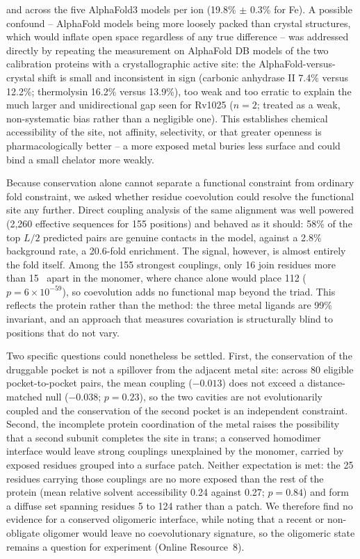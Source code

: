 \documentclass[11pt,a4paper]{article}
\newcommand{\ang}{\text{\AA}}
\begin{document}
and across the five AlphaFold3 models per ion (19.8\% $\pm$ 0.3\% for Fe). A possible confound -- AlphaFold models being more loosely packed than crystal structures, which would inflate open space regardless of any true difference -- was addressed directly by repeating the measurement on AlphaFold DB models of the two calibration proteins with a crystallographic active site: the AlphaFold-versus-crystal shift is small and inconsistent in sign (carbonic anhydrase II 7.4\% versus 12.2\%; thermolysin 16.2\% versus 13.9\%), too weak and too erratic to explain the much larger and unidirectional gap seen for Rv1025 ($n=2$; treated as a weak, non-systematic bias rather than a negligible one). This establishes chemical accessibility of the site, not affinity, selectivity, or that greater openness is pharmacologically better -- a more exposed metal buries less surface and could bind a small chelator more weakly.

Because conservation alone cannot separate a functional constraint from ordinary fold constraint, we asked whether residue coevolution could resolve the functional site any further. Direct coupling analysis of the same alignment was well powered (2{,}260 effective sequences for 155 positions) and behaved as it should: 58\% of the top $L/2$ predicted pairs are genuine contacts in the model, against a 2.8\% background rate, a 20.6-fold enrichment. The signal, however, is almost entirely the fold itself. Among the 155 strongest couplings, only 16 join residues more than 15~\ang{} apart in the monomer, where chance alone would place 112 ($p=6\times10^{-59}$), so coevolution adds no functional map beyond the triad. This reflects the protein rather than the method: the three metal ligands are 99\% invariant, and an approach that measures covariation is structurally blind to positions that do not vary.

Two specific questions could nonetheless be settled. First, the conservation of the druggable pocket is not a spillover from the adjacent metal site: across 80 eligible pocket-to-pocket pairs, the mean coupling ($-0.013$) does not exceed a distance-matched null ($-0.038$; $p=0.23$), so the two cavities are not evolutionarily coupled and the conservation of the second pocket is an independent constraint. Second, the incomplete protein coordination of the metal raises the possibility that a second subunit completes the site in trans; a conserved homodimer interface would leave strong couplings unexplained by the monomer, carried by exposed residues grouped into a surface patch. Neither expectation is met: the 25 residues carrying those couplings are no more exposed than the rest of the protein (mean relative solvent accessibility 0.24 against 0.27; $p=0.84$) and form a diffuse set spanning residues 5 to 124 rather than a patch. We therefore find no evidence for a conserved oligomeric interface, while noting that a recent or non-obligate oligomer would leave no coevolutionary signature, so the oligomeric state remains a question for experiment (Online Resource~8).
\end{document}
